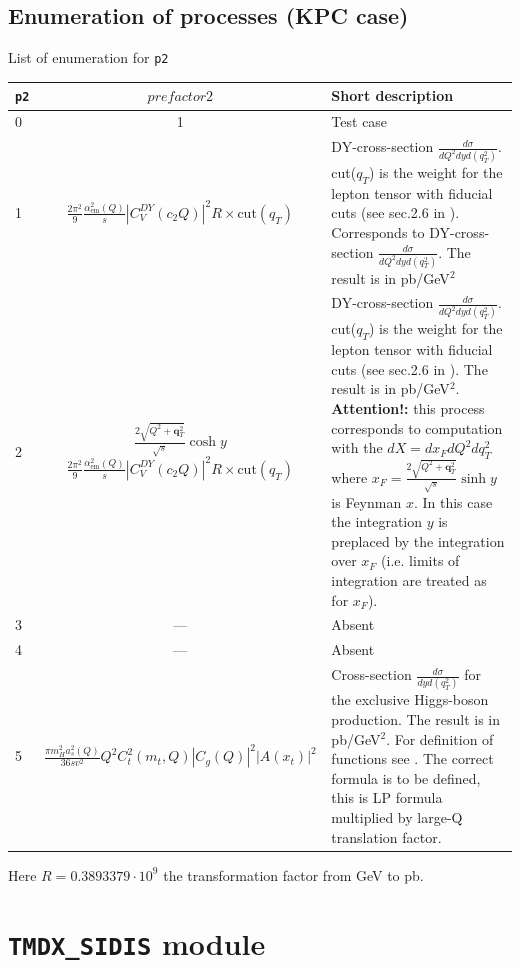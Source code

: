 \documentclass[prd,nofootinbib,eqsecnum,final]{revtex4}
\renewcommand{\(}{\left(}
\renewcommand{\)}{\right)}
\renewcommand{\[}{\left[}
\renewcommand{\]}{\right]}
\renewcommand{\vec}[1]{\bm{#1}}
\newcommand{\red}[1]{{\color[rgb]{1,0,0} #1}}
\begin{document}
\subsection{Enumeration of processes (KPC case)}

\begin{center}
List of enumeration for \texttt{p2}
\\
\begin{tabular}{||l|c||p{10cm}||}
\hline\hline
\texttt{p2} & ~~$prefactor2$~~&  Short description 
\\\hline
0 & 1 & Test case
\\\hline
1 & $\frac{2\pi^2}{9}\frac{\alpha_{\text{em}}^2(Q)}{s}|C_V^{DY}(c_2Q)|^2 R \times \text{cut}(q_T)$ & DY-cross-section $\frac{d\sigma}{dQ^2 dy d(q_T^2)}$. cut($q_T$) is the weight for the lepton tensor with fiducial cuts (see sec.2.6 in \cite{Scimemi:2017etj}). Corresponds to DY-cross-section $\frac{d\sigma}{dQ^2 dy d(q_T^2)}$.  The result is in pb/GeV$^2$
\\\hline
2 & $\frac{2\sqrt{Q^2+\vec q_T^2}}{\sqrt{s}}\cosh y$ $\frac{2\pi^2}{9}\frac{\alpha_{\text{em}}^2(Q)}{s}|C_V^{DY}(c_2Q)|^2 R \times \text{cut}(q_T)$ & DY-cross-section $\frac{d\sigma}{dQ^2 dy d(q_T^2)}$. cut($q_T$) is the weight for the lepton tensor with fiducial cuts (see sec.2.6 in \cite{Scimemi:2017etj}).  The result is in pb/GeV$^2$. \textbf{Attention!:} this process corresponds to computation with the $dX=dx_F dQ^2 dq_T^2$ where $x_F=\frac{2\sqrt{Q^2+\vec q_T^2}}{\sqrt{s}}\sinh y$ is Feynman $x$. In this case the integration $y$ is preplaced by the integration over $x_F$ (i.e. limits of integration are treated as for $x_F$).
\\\hline
3 & --- & Absent
\\\hline
4 & --- & Absent
\\\hline
5 & $\frac{\pi m_H^2 a_s^2(Q)}{36 s v^2}Q^2 C_t^2(m_t,Q)|C_g(Q)|^2|A(x_t)|^2$ & Cross-section $\frac{d\sigma}{dy d(q_T^2)}$ for the exclusive Higgs-boson production. The result is in pb/GeV$^2$. For definition of functions see \cite{Ahrens:2009cxz}. \red{The correct formula is to be defined, this is LP formula multiplied by large-Q translation factor.}
\\\hline\hline
\end{tabular}
Here $R=0.3893379\cdot 10^9$ the transformation factor from GeV to pb.
\end{center}

\newpage
\section{\texttt{TMDX{\_}SIDIS} module}
\label{TMDXs}
\end{document}
